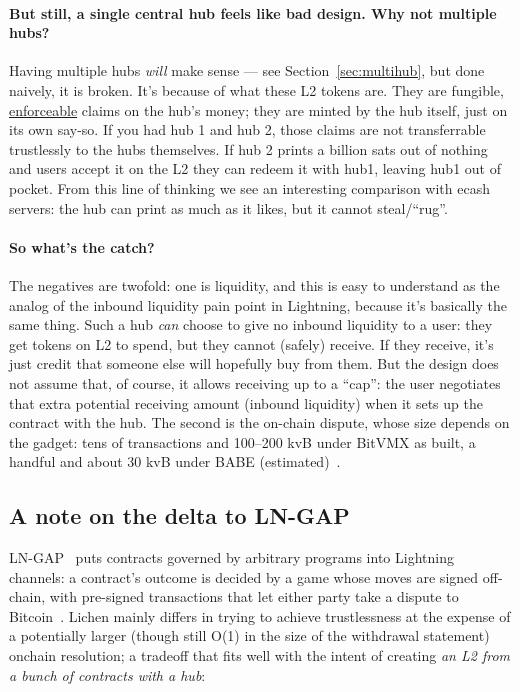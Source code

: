 \documentclass[11pt]{article}
\begin{document}
\paragraph{But still, a single central hub feels like bad design. Why not multiple hubs?} Having multiple hubs \emph{will} make sense --- see Section~\ref{sec:multihub}, but done naively, it is broken. It's because of what these L2 tokens are. They are fungible, \underline{enforceable} claims on the hub's money; they are minted by the hub itself, just on its own say-so. If you had hub 1 and hub 2, those claims are not transferrable trustlessly to the hubs themselves. If hub 2 prints a billion sats out of nothing and users accept it on the L2 they can redeem it with hub1, leaving hub1 out of pocket. From this line of thinking we see an interesting comparison with ecash servers: the hub can print as much as it likes, but it cannot steal/``rug''.

\paragraph{So what's the catch?} The negatives are twofold: one is liquidity, and this is easy to understand as the analog of the inbound liquidity pain point in Lightning, because it's basically the same thing. Such a hub \emph{can} choose to give no inbound liquidity to a user: they get tokens on L2 to spend, but they cannot (safely) receive. If they receive, it's just credit that someone else will hopefully buy from them. But the design does not assume that, of course, it allows receiving up to a ``cap'': the user negotiates that extra potential receiving amount (inbound liquidity) when it sets up the contract with the hub. The second is the on-chain dispute, whose size depends on the gadget: tens of transactions and 100–200 kvB under BitVMX as built, a handful and about 30 kvB under BABE (estimated)~\cite{lichenbitvmx,lichenbabe}.

\subsection{A note on the delta to LN-GAP}
\label{sec:family}

LN-GAP~\cite{lngap} puts contracts governed by arbitrary programs into Lightning~\cite{lightning}
channels: a contract's outcome is decided by a game whose moves are
signed off-chain, with pre-signed transactions that let either party
take a dispute to Bitcoin~\cite{lngap}. Lichen mainly differs in trying to achieve trustlessness at the expense of a potentially larger (though still O(1) in the size of the withdrawal statement) onchain resolution; a tradeoff that fits well with the intent of creating \emph{an L2 from a bunch of contracts with a hub}:
\end{document}
